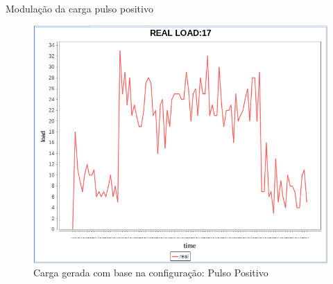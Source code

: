\begin{frame}{Modulação da carga pulso positivo}
\begin{figure}
\begin{minipage}{.45\textwidth}
			\includegraphics[scale=0.35]{../monograph/images/grafico-carga-modulada1.png}			
		\end{minipage}
		\caption{Carga gerada com base na configuração: Pulso Positivo}
	\end{figure}	
\end{frame}

